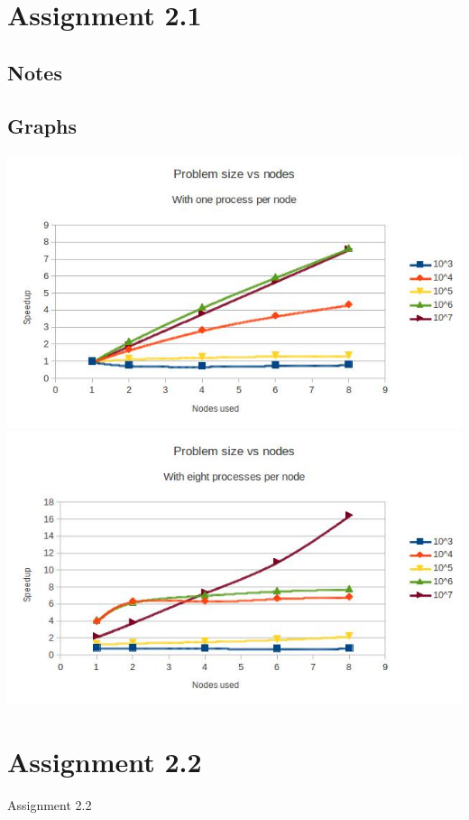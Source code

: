 \documentclass[12pt]{article}
\begin{document}
\maketitle
\section{Assignment 2.1}
\subsection{Notes}
\subsection{Graphs}
\includegraphics[width=\textwidth]{oneproc.jpg}
\includegraphics[width=\textwidth]{eightproc.jpg}

\section{Assignment 2.2}
Assignment 2.2
\end{document}

